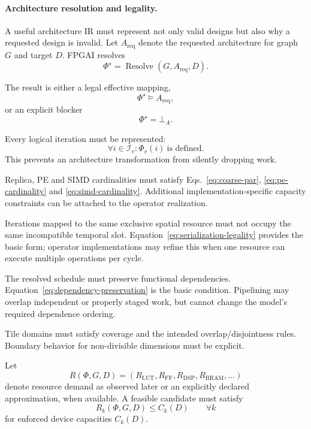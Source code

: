 \documentclass{article}
\begin{document}
\paragraph{Architecture resolution and legality.}
\label{sec:resolution}

A useful architecture IR must represent not only valid designs but also why a requested design is invalid. Let $A_{\mathrm{req}}$ denote the requested architecture for graph $G$ and target $D$. FPGAI resolves
\begin{equation}
\Phi^\star
=
\operatorname{Resolve}(G,A_{\mathrm{req}},D).
\label{eq:resolve-main}
\end{equation}

The result is either a legal effective mapping,
\begin{equation}
\Phi^\star\models A_{\mathrm{req}},
\end{equation}
or an explicit blocker
\begin{equation}
\Phi^\star=\bot_{A}.
\end{equation}


Every logical iteration must be represented:
\begin{equation}
\forall i\in\mathcal{I}_v:
\Phi_v(i)\ \text{is defined}.
\label{eq:coverage}
\end{equation}
This prevents an architecture transformation from silently dropping work.


Replica, PE and SIMD cardinalities must satisfy Eqs.~\ref{eq:coarse-par}, \ref{eq:pe-cardinality} and \ref{eq:simd-cardinality}. Additional implementation-specific capacity constraints can be attached to the operator realization.


Iterations mapped to the same exclusive spatial resource must not occupy the same incompatible temporal slot. Equation~\ref{eq:serialization-legality} provides the basic form; operator implementations may refine this when one resource can execute multiple operations per cycle.


The resolved schedule must preserve functional dependencies. Equation~\ref{eq:dependency-preservation} is the basic condition. Pipelining may overlap independent or properly staged work, but cannot change the model's required dependence ordering.


Tile domains must satisfy coverage and the intended overlap/disjointness rules. Boundary behavior for non-divisible dimensions must be explicit.


Let
\begin{equation}
R(\Phi,G,D)
=
(R_{\mathrm{LUT}},R_{\mathrm{FF}},R_{\mathrm{DSP}},R_{\mathrm{BRAM}},\ldots)
\end{equation}
denote resource demand as observed later or an explicitly declared approximation, when available. A feasible candidate must satisfy
\begin{equation}
R_k(\Phi,G,D)\le C_k(D)
\qquad
\forall k
\label{eq:resource-feasibility}
\end{equation}
for enforced device capacities $C_k(D)$.
\end{document}
